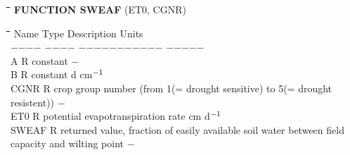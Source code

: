 \bigskip
\nwln
\begin{tabbing}
\hspace{1.27cm}\=\hspace{1.27cm}\=\hspace{1.27cm}\=\hspace{1.27cm}\=%
\hspace{1.27cm}\=\hspace{1.27cm}\=\hspace{1.27cm}\=\hspace{1.27cm}\=%
\hspace{1.27cm}\=\hspace{1.27cm}\=\kill
{\bf FUNCTION SWEAF}\> \> \> (ET0, CGNR)
\end{tabbing}
\nwln
\begin{tabbing}
\hspace{1.27cm}\=\hspace{1.27cm}\=\hspace{1.27cm}\=\hspace{1.27cm}\=%
\hspace{1.27cm}\=\hspace{1.27cm}\=\hspace{1.27cm}\=\hspace{1.27cm}\=%
\hspace{1.27cm}\=\hspace{1.27cm}\=\kill
Name    \> \> Type   \> Description                                        \> \> \> \> \> \> \> Units\\
$-$$-$$-$$-$    \> \> $-$$-$$-$$-$   \> $-$$-$$-$$-$$-$$-$$-$$-$$-$$-$$-$                                        \> \> \> \> \> \> \> $-$$-$$-$$-$$-$\\
A       \> \> R   \> constant                                           \> \> \> \> \> \> \> $-$\\
B       \> \> R   \> constant                                           \> \> \> \> \> \> \> d cm$^{{\rm -1}}$\\
CGNR    \> \> R   \> crop group number (from 1(= drought sensitive) to 5(= drought resistent))   \> \> \> \> \> \> \> $-$  \\
ET0     \> \> R   \> potential evapotranspiration rate                  \> \> \> \> \> \> \> cm d$^{{\rm -1}}$ \\
SWEAF   \> \> R   \> returned value, fraction of easily available soil water between field \\
\>\> \> capacity and wilting point                                      \> \> \> \> \> \> \> $-$
\end{tabbing}


